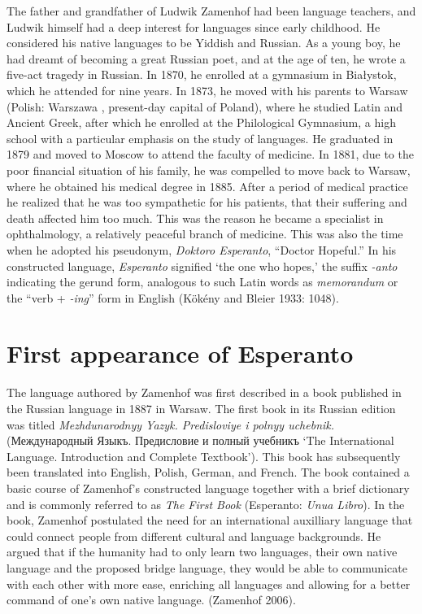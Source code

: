 The father and grandfather of Ludwik Zamenhof had been language teachers, and Ludwik himself had a deep interest for languages since early childhood.
He considered his native languages to be Yiddish and Russian.
As a young boy, he had dreamt of becoming a great Russian poet, and at the age of ten, he wrote a five-act tragedy in Russian.
In 1870, he enrolled at a gymnasium in Białystok, which he attended for nine years.
In 1873, he moved with his parents to Warsaw (Polish: Warszawa \ipa{[varˈʂava]}, present-day capital of Poland), where he studied Latin and Ancient Greek, after which he enrolled at the Philological Gymnasium, a high school with a particular emphasis on the study of languages.
He graduated in 1879 and moved to Moscow to attend the faculty of medicine.
In 1881, due to the poor financial situation of his family, he was compelled to move back to Warsaw, where he obtained his medical degree in 1885.
After a period of medical practice he realized that he was too sympathetic for his patients, that their suffering and death affected him too much.
This was the reason he became a specialist in ophthalmology, a relatively peaceful branch of medicine.
This was also the time when he adopted his pseudonym, \textit{Doktoro Esperanto}, ``Doctor Hopeful.''
In his constructed language, \textit{Esperanto} signified `the one who hopes,'
the suffix \textit{-anto} indicating the gerund form, analogous to such Latin words as \textit{memorandum} or the ``verb + \textit{-ing}'' form in English
(Kökény and Bleier 1933: 1048).

\section{First appearance of Esperanto}
The language authored by Zamenhof was first described in a book published in the Russian language in 1887 in Warsaw.
The first book in its Russian edition was titled \textit{Mezhdunarodnyy Yazyk. Predisloviye i polnyy uchebnik.}
({\cyrfont Между\-на\-род\-ный Языкъ. Предисловие и полный учебникъ} `The International Language. Introduction and Complete Textbook').
This book has subsequently been translated into English, Polish, German, and French.
The book contained a basic course of Zamenhof's constructed language together with a brief dictionary and is commonly referred to as \textit{The First Book} (Esperanto: \textit{Unua Libro}).
In the book, Zamenhof postulated the need for an international auxilliary language that could connect people from different cultural and language backgrounds.
He argued that if the humanity had to only learn two languages, their own native language and the proposed bridge language, they would be able to communicate with each other with more ease, enriching all languages and allowing for a better command of one's own native language.
(Zamenhof 2006).

